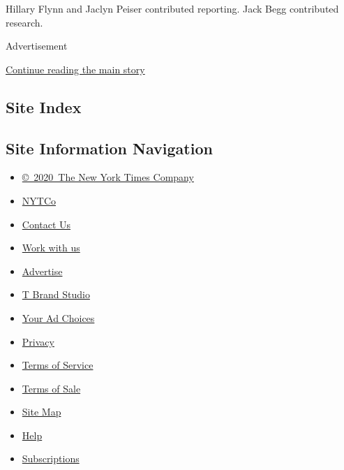 Hillary Flynn and Jaclyn Peiser contributed reporting. Jack Begg
contributed research.

Advertisement

\protect\hyperlink{after-bottom}{Continue reading the main story}

\hypertarget{site-index}{%
\subsection{Site Index}\label{site-index}}

\hypertarget{site-information-navigation}{%
\subsection{Site Information
Navigation}\label{site-information-navigation}}

\begin{itemize}
\tightlist
\item
  \href{https://help.nytimes.com/hc/en-us/articles/115014792127-Copyright-notice}{©~2020~The
  New York Times Company}
\end{itemize}

\begin{itemize}
\tightlist
\item
  \href{https://www.nytco.com/}{NYTCo}
\item
  \href{https://help.nytimes.com/hc/en-us/articles/115015385887-Contact-Us}{Contact
  Us}
\item
  \href{https://www.nytco.com/careers/}{Work with us}
\item
  \href{https://nytmediakit.com/}{Advertise}
\item
  \href{http://www.tbrandstudio.com/}{T Brand Studio}
\item
  \href{https://www.nytimes.com/privacy/cookie-policy\#how-do-i-manage-trackers}{Your
  Ad Choices}
\item
  \href{https://www.nytimes.com/privacy}{Privacy}
\item
  \href{https://help.nytimes.com/hc/en-us/articles/115014893428-Terms-of-service}{Terms
  of Service}
\item
  \href{https://help.nytimes.com/hc/en-us/articles/115014893968-Terms-of-sale}{Terms
  of Sale}
\item
  \href{https://spiderbites.nytimes.com}{Site Map}
\item
  \href{https://help.nytimes.com/hc/en-us}{Help}
\item
  \href{https://www.nytimes.com/subscription?campaignId=37WXW}{Subscriptions}
\end{itemize}
